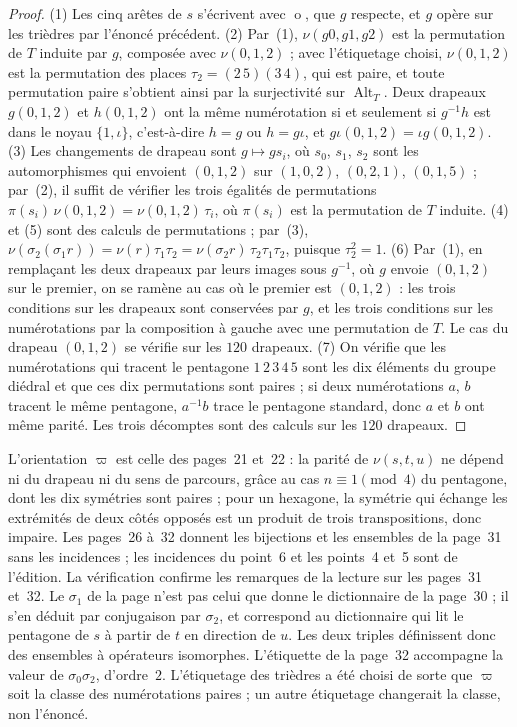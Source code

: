 \begin{proof}
(1) Les cinq arêtes de $s$ s'écrivent avec $\operatorname{o}$, que $g$ respecte, et $g$ opère sur les trièdres par l'énoncé précédent. (2) Par~(1), $\nu(g0, g1, g2)$ est la permutation de $T$ induite par $g$, composée avec $\nu(0, 1, 2)$ ; avec l'étiquetage choisi, $\nu(0, 1, 2)$ est la permutation des places $\tau_2 = (2\,5)(3\,4)$, qui est paire, et toute permutation paire s'obtient ainsi par la surjectivité sur $\operatorname{Alt}_T$. Deux drapeaux $g(0,1,2)$ et $h(0,1,2)$ ont la même numérotation si et seulement si $g^{-1}h$ est dans le noyau $\{1, \iota\}$, c'est-à-dire $h = g$ ou $h = g\iota$, et $g\iota(0,1,2) = \iota g(0,1,2)$. (3) Les changements de drapeau sont $g \mapsto g s_i$, où $s_0$, $s_1$, $s_2$ sont les automorphismes qui envoient $(0, 1, 2)$ sur $(1, 0, 2)$, $(0, 2, 1)$, $(0, 1, 5)$ ; par~(2), il suffit de vérifier les trois égalités de permutations $\pi(s_i)\,\nu(0,1,2) = \nu(0,1,2)\,\tau_i$, où $\pi(s_i)$ est la permutation de $T$ induite. (4) et (5) sont des calculs de permutations ; par~(3), $\nu(\sigma_2(\sigma_1 r)) = \nu(r)\tau_1\tau_2 = \nu(\sigma_2 r)\,\tau_2\tau_1\tau_2$, puisque $\tau_2^2 = 1$. (6) Par~(1), en remplaçant les deux drapeaux par leurs images sous $g^{-1}$, où $g$ envoie $(0, 1, 2)$ sur le premier, on se ramène au cas où le premier est $(0, 1, 2)$ : les trois conditions sur les drapeaux sont conservées par $g$, et les trois conditions sur les numérotations par la composition à gauche avec une permutation de $T$. Le cas du drapeau $(0, 1, 2)$ se vérifie sur les $120$ drapeaux. (7) On vérifie que les numérotations qui tracent le pentagone $1\,2\,3\,4\,5$ sont les dix éléments du groupe diédral et que ces dix permutations sont paires ; si deux numérotations $a$, $b$ tracent le même pentagone, $a^{-1}b$ trace le pentagone standard, donc $a$ et $b$ ont même parité. Les trois décomptes sont des calculs sur les $120$ drapeaux.
\end{proof}

\begin{remarque}
L'orientation $\varpi$ est celle des pages~21 et~22 : la parité de $\nu(s, t, u)$ ne dépend ni du drapeau ni du sens de parcours, grâce au cas $n \equiv 1 \pmod 4$ du pentagone, dont les dix symétries sont paires ; pour un hexagone, la symétrie qui échange les extrémités de deux côtés opposés est un produit de trois transpositions, donc impaire. Les pages~26 à~32 donnent les bijections et les ensembles de la page~31 sans les incidences ; les incidences du point~6 et les points~4 et~5 sont de l'édition. La vérification confirme les remarques de la lecture sur les pages~31 et~32. Le $\sigma_1$ de la page n'est pas celui que donne le dictionnaire de la page~30 ; il s'en déduit par conjugaison par $\sigma_2$, et correspond au dictionnaire qui lit le pentagone de $s$ à partir de $t$ en direction de $u$. Les deux triples définissent donc des ensembles à opérateurs isomorphes. L'étiquette  de la page~32 accompagne la valeur de $\sigma_0\sigma_2$, d'ordre~$2$. L'étiquetage des trièdres a été choisi de sorte que $\varpi$ soit la classe des numérotations paires ; un autre étiquetage changerait la classe, non l'énoncé.
\end{remarque}

